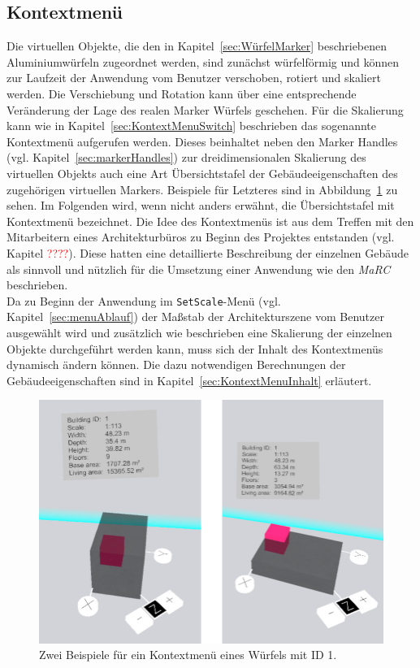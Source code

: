 \subsection{Kontextmenü}\label{sec:kontextMenu}
Die virtuellen Objekte, die den in Kapitel~\ref{sec:WürfelMarker} beschriebenen Aluminiumwürfeln zugeordnet werden, sind zunächst würfelförmig und können zur Laufzeit der Anwendung vom Benutzer verschoben, rotiert und skaliert werden. Die Verschiebung und Rotation kann über eine entsprechende Veränderung der Lage des realen Marker Würfels geschehen. Für die Skalierung kann wie in Kapitel~\ref{sec:KontextMenuSwitch} beschrieben das sogenannte Kontextmenü aufgerufen werden. Dieses beinhaltet neben den Marker Handles (vgl. Kapitel~\ref{sec:markerHandles}) zur dreidimensionalen Skalierung des virtuellen Objekts auch eine Art Übersichtstafel der Gebäudeeigenschaften des zugehörigen virtuellen Markers. Beispiele für Letzteres sind in Abbildung~\ref{fig:KontextmenuExamples} zu sehen. Im Folgenden wird, wenn nicht anders erwähnt, die Übersichtstafel mit Kontextmenü bezeichnet. Die Idee des Kontextmenüs ist aus dem Treffen mit den Mitarbeitern eines Architekturbüros zu Beginn des Projektes entstanden (vgl. Kapitel \textcolor{red}{????}). Diese hatten eine detaillierte Beschreibung der einzelnen Gebäude als sinnvoll und nützlich für die Umsetzung einer Anwendung wie den \textit{MaRC} beschrieben.\\
Da zu Beginn der Anwendung im \texttt{SetScale}-Menü (vgl. Kapitel~\ref{sec:menuAblauf}) der Maßstab der Architekturszene vom Benutzer ausgewählt wird und zusätzlich wie beschrieben eine Skalierung der einzelnen Objekte durchgeführt werden kann, muss sich der Inhalt des Kontextmenüs dynamisch ändern können. Die dazu notwendigen Berechnungen der Gebäudeeigenschaften sind in Kapitel~\ref{sec:KontextMenuInhalt} erläutert. 

\begin{figure}[H]
	\centering
	\includegraphics[scale=.3]{Bilder/Eigene Fotos/KontextMenue.jpg}
	\caption{Zwei Beispiele für ein Kontextmenü eines Würfels mit ID 1.}
	\label{fig:KontextmenuExamples}
\end{figure}

